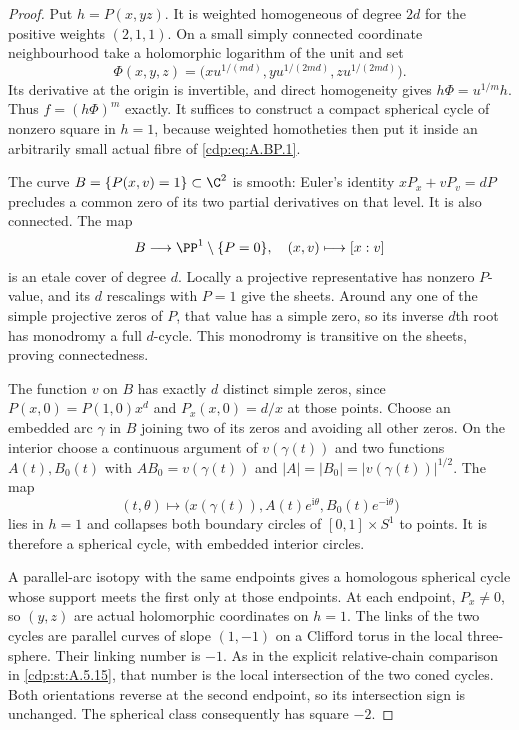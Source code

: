 \begin{proof}
Put $h=P(x,yz)$. It is weighted homogeneous of degree
$2d$ for the positive weights $(2,1,1)$.
On a small simply connected coordinate neighbourhood
take a holomorphic logarithm of the unit and set
\[
 \Phi(x,y,z)=\bigl(xu^{1/(md)},
                  yu^{1/(2md)},zu^{1/(2md)}\bigr).
                                                        \tag{A.BP.2}\label{cdp:eq:A.BP.2}
\]
Its derivative at the origin is invertible, and direct
homogeneity gives $h\Phi=u^{1/m}h$. Thus
$f=(h\Phi)^m$ exactly. It suffices to construct a
compact spherical cycle of nonzero square in $h=1$,
because weighted homotheties then put it inside an
arbitrarily small actual fibre of \eqref{cdp:eq:A.BP.1}.

The curve $B=\{P(x,v)=1\}\subset\C^2$ is smooth:
Euler's identity $xP_x+vP_v=dP$ precludes a common
zero of its two partial derivatives on that level.
It is also connected. The map
\[
 B\longrightarrow\PP^1\setminus\{P=0\},
                       \quad(x,v)\longmapsto[x:v]
\]
is an etale cover of degree $d$. Locally a projective
representative has nonzero $P$-value, and its $d$
rescalings with $P=1$ give the sheets. Around any
one of the simple projective zeros of $P$, that
value has a simple zero, so its inverse $d$th root
has monodromy a full $d$-cycle. This monodromy is
transitive on the sheets, proving connectedness.

The function $v$ on $B$ has exactly $d$ distinct
simple zeros, since
$P(x,0)=P(1,0)x^d$ and $P_x(x,0)=d/x$ at those
points. Choose an embedded arc $\gamma$ in $B$
joining two of its zeros and avoiding all other
zeros. On the interior choose a continuous argument
of $v(\gamma(t))$ and two functions $A(t),B_0(t)$
with $A B_0=v(\gamma(t))$ and
$|A|=|B_0|=|v(\gamma(t))|^{1/2}$.
The map
\[
 (t,\theta)\longmapsto
   \bigl(x(\gamma(t)),A(t)e^{\mathrm i\theta},
                        B_0(t)e^{-\mathrm i\theta}\bigr)
                                                        \tag{A.BP.3}\label{cdp:eq:A.BP.3}
\]
lies in $h=1$ and collapses both boundary circles
of $[0,1]\times S^1$ to points. It is therefore a
spherical cycle, with embedded interior circles.

A parallel-arc isotopy with the same endpoints gives
a homologous spherical cycle whose support meets
the first only at those endpoints. At each endpoint,
$P_x\ne0$, so $(y,z)$ are actual holomorphic
coordinates on $h=1$. The links of the two cycles
are parallel curves of slope $(1,-1)$ on a Clifford
torus in the local three-sphere. Their linking
number is $-1$. As in the explicit relative-chain
comparison in \ref{cdp:st:A.5.15}, that number is the local
intersection of the two coned cycles. Both
orientations reverse at the second endpoint,
so its intersection sign is unchanged. The
spherical class consequently has square $-2$.


\end{proof}
